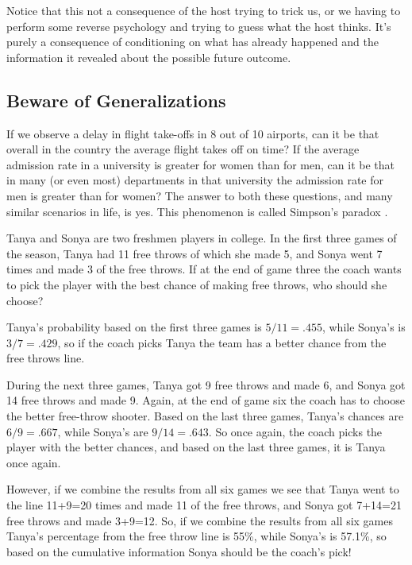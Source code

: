 Notice that this not a consequence of the host trying to trick us, or we having
to perform some reverse psychology and trying to guess what the host
thinks. It's purely a consequence of conditioning on what has already happened
and the information it revealed about the possible future outcome.

\subsection{Beware of Generalizations}\label{sec:simpsons-paradox}
If we observe a delay in flight take-offs in 8 out of 10 airports, can it be
that overall in the country the average flight takes off on time? If the average
admission rate in a university is greater for women than for men, can it be that
in many (or even most) departments in that university the admission rate for men
is greater than for women? The answer to both these questions, and many similar
scenarios in life, is yes. This phenomenon is called Simpson's paradox .

\begin{example}
Tanya and Sonya are two freshmen players in college. In the first three games of the
season, Tanya had 11 free throws of which she made 5, and Sonya went 7 times and
made 3 of the free throws. If at the end of game three the coach wants to pick
the player with the best chance of making free throws, who should she choose?

Tanya's probability based on the first three games is $5/11 = .455$, while
Sonya's is $3/7 = .429$, so if the coach picks Tanya the team has a better
chance from the free throws line.

During the next three games, Tanya got 9 free throws and made 6, and Sonya got
14 free throws and made 9. Again, at the end of game six the coach has to
choose the better free-throw shooter. Based on the last three games, Tanya's chances
are $6/9 = .667$, while Sonya's are $9/14 = .643$. So once again, the coach
picks the player with the better chances, and based on the last three games, it
is Tanya once again.

However, if we combine the results from all six games we see that Tanya went to
the line 11+9=20 times and made 11 of the free throws, and Sonya got 7+14=21
free throws and made 3+9=12. So, if we combine the results from all six games
Tanya's percentage from the free throw line is 55\%, while Sonya's is 57.1\%, so
based on the cumulative information Sonya should be the coach's pick!
\end{example}

